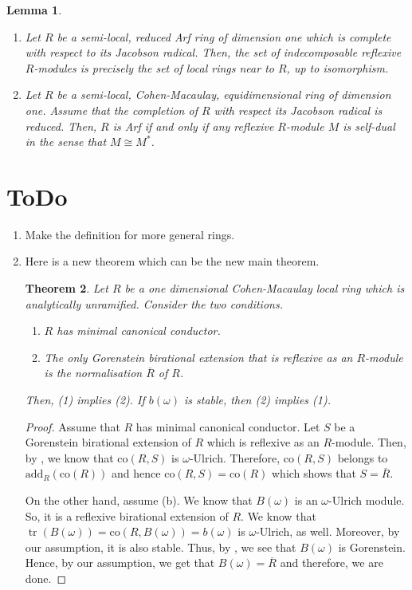 \documentclass[12pt]{amsart}
\newcommand\co{\mathrm{co}}
\newcommand{\add}{\mathrm{add}}
\newtheorem{theorem}{Theorem}[section]
\newtheorem{lemma}[theorem]{Lemma}
\theoremstyle{definition}
\DeclareMathOperator{\tr}{\mathrm{tr}}
\begin{document}
\begin{lemma}
    \begin{enumerate}
        \item Let $R$ be a semi-local, reduced Arf ring of dimension one which is complete with respect to its Jacobson radical. Then, the set of indecomposable reflexive $R$-modules is precisely the set of local rings near to $R$, up to isomorphism.
        \item Let $R$ be a semi-local, Cohen-Macaulay, equidimensional ring of dimension one. Assume that the completion of $R$ with respect its Jacobson radical is reduced. Then, $R$ is Arf if and only if any reflexive $R$-module $M$ is self-dual in the sense that $M \cong M^*$.
    \end{enumerate}
\end{lemma}

\section{ToDo}

\begin{enumerate}
    \item Make the definition for more general rings.
    \item Here is a new theorem which can be the new main theorem. 
    \begin{theorem}
    Let $R$ be a one dimensional Cohen-Macaulay local ring which is analytically unramified. Consider the two conditions.
    \begin{enumerate}
        \item $R$ has minimal canonical conductor.
        \item The only Gorenstein birational extension that is reflexive as an $R$-module is the normalisation $\overline{R}$ of $R$. 
    \end{enumerate}
    Then, (1) implies (2). If $b(\omega)$ is stable, then (2) implies (1).
    \end{theorem}
    \begin{proof}
        Assume that $R$ has minimal canonical conductor. Let $S$ be a Gorenstein birational extension of $R$ which is reflexive as an $R$-module. Then, by \cite[Theorem 7.10]{Dao-Maitra-Sridhar}, we know that $\co(R,S)$ is $\omega$-Ulrich. Therefore, $\co(R,S)$ belongs to $\add_R(\co(R))$ and hence $\co(R,S) = \co(R)$ which shows that $S = \overline{R}$.

        On the other hand, assume (b). We know that $B(\omega)$ is an $\omega$-Ulrich module. So, it is a reflexive birational extension of $R$. We know that $\tr(B(\omega))=\co(R, B(\omega)) = b(\omega)$ is $\omega$-Ulrich, as well. Moreover, by our assumption, it is also stable. Thus, by \cite[Theorem 7.10]{Dao-Maitra-Sridhar}, we see that $B(\omega)$ is Gorenstein. Hence, by our assumption, we get that $B(\omega) = \overline{R}$ and therefore, we are done.
    \end{proof}
\end{enumerate}
\fi



\end{document}
